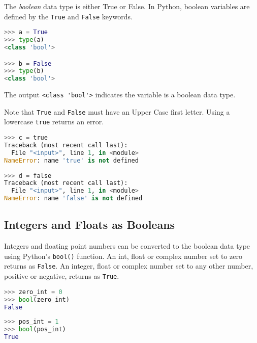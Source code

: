 \documentclass{book}
\newcommand{\passthrough}[1]{#1}
\begin{document}
    
        The \emph{boolean} data type is either True or False. In Python, boolean
variables are defined by the \passthrough{\lstinline!True!} and
\passthrough{\lstinline!False!} keywords.

\begin{lstlisting}[language=Python]
>>> a = True
>>> type(a)
<class 'bool'>

>>> b = False
>>> type(b)
<class 'bool'>
\end{lstlisting}

The output \passthrough{\lstinline!<class 'bool'>!} indicates the
variable is a boolean data type.

Note that \passthrough{\lstinline!True!} and
\passthrough{\lstinline!False!} must have an Upper Case first letter.
Using a lowercase \passthrough{\lstinline!true!} returns an error.

\begin{lstlisting}[language=Python]
>>> c = true
Traceback (most recent call last):
  File "<input>", line 1, in <module>
NameError: name 'true' is not defined
   
>>> d = false
Traceback (most recent call last):
  File "<input>", line 1, in <module>
NameError: name 'false' is not defined
\end{lstlisting}
    




    
        \hypertarget{integers-and-floats-as-booleans}{%
\subsection{Integers and Floats as
Booleans}\label{integers-and-floats-as-booleans}}

Integers and floating point numbers can be converted to the boolean data
type using Python's \passthrough{\lstinline!bool()!} function. An int,
float or complex number set to zero returns as
\passthrough{\lstinline!False!}. An integer, float or complex number set
to any other number, positive or negative, returns as
\passthrough{\lstinline!True!}.

\begin{lstlisting}[language=Python]
>>> zero_int = 0
>>> bool(zero_int)
False
\end{lstlisting}

\begin{lstlisting}[language=Python]
>>> pos_int = 1
>>> bool(pos_int)
True
\end{lstlisting}
\end{document}
